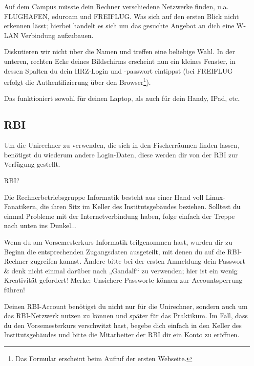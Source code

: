 Auf dem Campus müsste dein Rechner verschiedene Netzwerke finden, u.a. FLUGHAFEN, eduroam und FREIFLUG. Was sich auf den
ersten Blick nicht erkennen lässt; hierbei handelt es sich um das gesuchte Angebot an dich eine W-LAN Verbindung
aufzubauen.

Diskutieren wir nicht über die Namen und treffen eine beliebige Wahl. In der unteren, rechten Ecke deines
Bildschirms erscheint nun ein kleines Fenster, in dessen Spalten du dein HRZ-Login und -passwort eintippst (bei FREIFLUG
erfolgt die Authentifizierung über den Browser\footnote{Das Formular erscheint beim Aufruf der ersten Webseite.}).

Das funktioniert sowohl für deinen Laptop, als auch für dein Handy, IPad, etc.

%
%
\subsection*{RBI}

Um die Unirechner zu verwenden, die sich in den Fischerräumen finden lassen, benötigst du wiederum andere Login-Daten,
diese werden dir von der RBI zur Verfügung gestellt.

\begin{fancyblock}{RBI?}

Die Rechnerbetriebsgruppe Informatik besteht aus einer Hand voll Linux-Fanatikern, die ihren Sitz
im Keller des Institutsgebäudes beziehen. Solltest du einmal Probleme mit der Internetverbindung haben, folge einfach
der Treppe nach unten ins Dunkel...
\end{fancyblock}

Wenn du am Vorsemesterkurs Informatik teilgenommen hast, wurden dir zu Beginn die entsprechenden Zugangsdaten
ausgeteilt, mit denen du auf die RBI-Rechner zugreifen kannst. Ändere bitte bei der ersten Anmeldung dein Passwort \&
denk nicht einmal darüber nach „Gandalf“ zu verwenden; hier ist ein wenig Kreativität gefordert! Merke: Unsichere Passworte können zur Accountsperrung führen! 

Deinen RBI-Account benötigst du nicht nur für die Unirechner, sondern auch um das RBI-Netzwerk nutzen zu können und
später für das Praktikum. Im Fall, dass du den Vorsemesterkurs verschwitzt hast, begebe dich einfach in den Keller des
Institutsgebäudes und bitte die Mitarbeiter der RBI dir ein Konto zu eröffnen.

